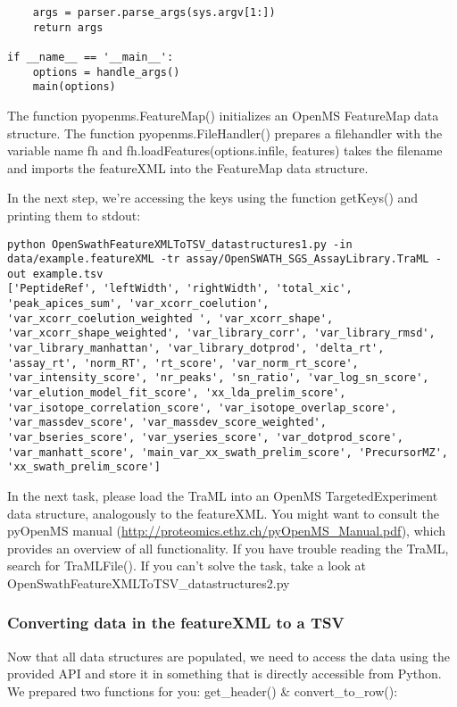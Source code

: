 {\begin{lstlisting}
    args = parser.parse_args(sys.argv[1:])
    return args

if __name__ == '__main__':
    options = handle_args()
    main(options)
\end{lstlisting}

The function pyopenms.FeatureMap() initializes an OpenMS FeatureMap data structure. The function pyopenms.FileHandler() prepares a filehandler with the variable name fh and fh.loadFeatures(options.infile, features) takes the filename and imports the featureXML into the FeatureMap data structure.

In the next step, we're accessing the keys using the function getKeys() and printing them to stdout:

\begin{lstlisting}
python OpenSwathFeatureXMLToTSV_datastructures1.py -in data/example.featureXML -tr assay/OpenSWATH_SGS_AssayLibrary.TraML -out example.tsv
['PeptideRef', 'leftWidth', 'rightWidth', 'total_xic', 'peak_apices_sum', 'var_xcorr_coelution', 'var_xcorr_coelution_weighted ', 'var_xcorr_shape', 'var_xcorr_shape_weighted', 'var_library_corr', 'var_library_rmsd', 'var_library_manhattan', 'var_library_dotprod', 'delta_rt', 'assay_rt', 'norm_RT', 'rt_score', 'var_norm_rt_score', 'var_intensity_score', 'nr_peaks', 'sn_ratio', 'var_log_sn_score', 'var_elution_model_fit_score', 'xx_lda_prelim_score', 'var_isotope_correlation_score', 'var_isotope_overlap_score', 'var_massdev_score', 'var_massdev_score_weighted', 'var_bseries_score', 'var_yseries_score', 'var_dotprod_score', 'var_manhatt_score', 'main_var_xx_swath_prelim_score', 'PrecursorMZ', 'xx_swath_prelim_score']
\end{lstlisting}

In the next task, please load the TraML into an OpenMS TargetedExperiment data structure, analogously to the featureXML. You might want to consult the pyOpenMS manual (\url{http://proteomics.ethz.ch/pyOpenMS_Manual.pdf}), which provides an overview of all functionality. If you have trouble reading the TraML, search for TraMLFile(). If you can't solve the task, take a look at OpenSwathFeatureXMLToTSV\_datastructures2.py

\subsubsection{Converting data in the featureXML to a TSV}
Now that all data structures are populated, we need to access the data using the provided API and store it in something that is directly accessible from Python. We prepared two functions for you: get\_header() \& convert\_to\_row():

}
